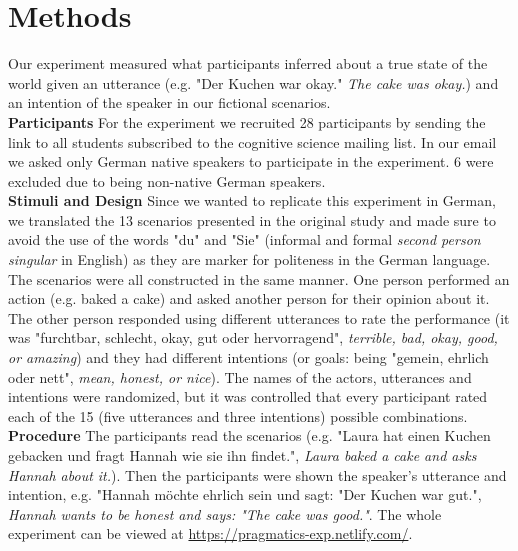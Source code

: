 \documentclass[a4paper,11pt]{article}
\begin{document}
\section{Methods}
Our experiment measured what participants inferred about a true state of the world given an utterance (e.g. "Der Kuchen war okay." \textit{The cake was okay.}) and an intention of the speaker in our fictional scenarios. \\
\textbf{Participants} For the experiment we recruited 28 participants by sending the link to all students subscribed to the cognitive science mailing list. In our email we asked only German native speakers to participate in the experiment. 6 were excluded due to being non-native German speakers.\\
\textbf{Stimuli and Design} Since we wanted to replicate this experiment in German, we translated the 13 scenarios presented in the original study and made sure to avoid the use of the words "du" and "Sie" (informal and formal \textit{second person singular} in English) as they are marker for politeness in the German language. The scenarios were all constructed in the same manner. One person performed an action (e.g. baked a cake) and asked another person for their opinion about it. The other person responded using different utterances to rate the performance (it was "furchtbar, schlecht, okay, gut oder hervorragend", \textit{terrible, bad, okay, good, or amazing}) and they had different intentions (or goals: being "gemein, ehrlich oder nett", \textit{mean, honest, or nice}). The names of the actors, utterances and intentions were randomized, but it was controlled that every participant rated each of the 15 (five utterances and three intentions) possible combinations.\\
\textbf{Procedure} The participants read the scenarios (e.g. "Laura hat einen Kuchen gebacken und fragt Hannah wie sie ihn findet.", \textit{Laura baked a cake and asks Hannah about it.}). Then the participants were shown the speaker's utterance and intention, e.g. "Hannah möchte ehrlich sein und sagt: "Der Kuchen war gut.", \textit{Hannah wants to be honest and says: "The cake was good."}. The whole experiment can be viewed at \url{https://pragmatics-exp.netlify.com/}. 
\end{document}
